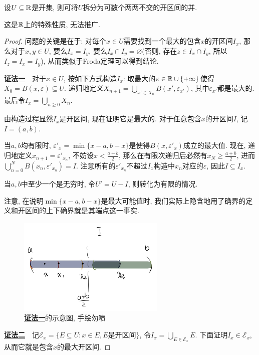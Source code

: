\begin{proposition}{}
	设$U \subseteq \mathbb{R}$是开集, 则可将$U$拆分为可数个两两不交的开区间的并. 
\end{proposition}
\begin{remark}
	这是$\mathbb{R}$上的特殊性质, 无法推广. 
\end{remark}
\begin{proof}
	问题的关键是在于: 对每个$x \in U$需要找到一个最大的包含$x$的开区间$I_x$, 那么对于$x, y\in U$, 要么$I_x = I_y$, 要么$I_x \cap I_y = \varnothing$(否则, 存在$z \in I_x \cap I_y$, 所以$I_z = I_x = I_y$), 从而类似于Froda定理可以得到结论. 
	
	\underline{\textbf{证法一}}~~对于$x \in U$, 按如下方式构造$I_x$: 取最大的$\varepsilon \in \mathbb{R} \cup \{ +\infty \}$使得$X_0 = B(x,\varepsilon) \subseteq U$. 递归地定义$X_{n+1} = \bigcup_{x' \in X_n} B(x',\varepsilon _{x'})$, 其中$\varepsilon _{x'}$都是最大的. 最后令$I_x = \bigcup_{n \geq 0}X_n$. 
	
	由构造过程显然$I_x$是开区间, 现在证明它是最大的. 对于任意包含$x$的开区间$I$, 记$I=(a,b)$. 
	
	当$a,b$均有限时, $\varepsilon '_x = \min \{ x-a,b-x \}$是使得$B(x,\varepsilon '_x)$成立的最大值. 现在, 递归地定义$x_{n+1} = \varepsilon '_{x_n}$, 不妨设$x<\frac{a+b}{2}$, 那么在有限次递归后必然有$x_N \geq \frac{a+b}{2}$, 进而$\bigcup_{n=0}^{N} B(x_n, \varepsilon '_{x_n}) = I$. 注意所有的$\varepsilon '_{x_n}$不超过$I_x$构造中$x_n$对应的$\varepsilon$, 因此$I \subseteq I_x$. 
	
	当$a,b$中至少一个是无穷时, 令$U'=U-I$, 则转化为有限的情况. 
	
	注意, 在说明$\min \{ x-a,b-x \}$是最大可能值时, 我们实际上隐含地用了确界的定义和开区间的上下确界就是其端点这一事实. 
	
\begin{figure}[H]
	\centering
	\includegraphics[width=7cm]{attachment/IMG_3538.jpg}
	\caption{\underline{\textbf{证法一}}的示意图, 手绘勿喷}
\end{figure}
	
	\underline{\textbf{证法二}}~~记$\mathcal{E}_x = \{ E \subseteq U: x \in E,E\textit{是开区间} \}$, 令$I_x = \bigcup_{E \in \mathcal{E}_x} E$. 下面证明$I_x \in \mathcal{E}_x$, 从而它就是包含$x$的最大开区间. 
	

\end{proof}
